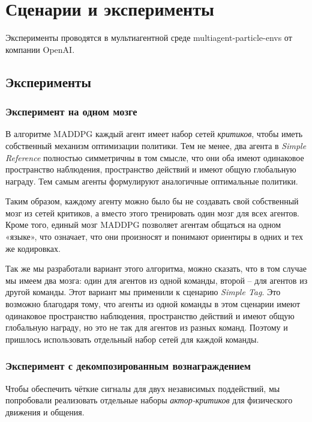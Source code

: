\chapter{Сценарии и эксперименты}

Эксперименты проводятся в мультиагентной среде multiagent-particle-envs \cite{multiagent-particle-envs} от компании OpenAI.


\section{Эксперименты}

\subsection{Эксперимент на одном мозге}

В алгоритме MADDPG каждый агент имеет набор сетей \textit{критиков}, чтобы иметь собственный механизм оптимизации политики. Тем не менее, два агента в \textit{Simple Reference} полностью симметричны в том смысле, что они оба имеют одинаковое пространство наблюдения, пространство действий и имеют общую глобальную награду. Тем самым агенты формулируют аналогичные оптимальные политики.

Таким образом, каждому агенту можно было бы не создавать свой собственный мозг из сетей критиков, а вместо этого тренировать один мозг для всех агентов. Кроме того, единый мозг MADDPG позволяет агентам общаться на одном «языке», что означает, что они произносят и понимают ориентиры в одних и тех же кодировках.

Так же мы разработали вариант этого алгоритма, можно сказать, что в том случае мы имеем два мозга: один для агентов из одной команды, второй – для агентов из другой команды. Этот вариант мы применили к сценарию \textit{Simple Tag}. Это возможно благодаря тому, что агенты из одной команды в этом сценарии имеют одинаковое пространство наблюдения, пространство действий и имеют общую глобальную награду, но это не так для агентов из разных команд. Поэтому и пришлось использовать отдельный набор сетей для каждой команды.

\subsection{Эксперимент с декомпозированным вознаграждением}

Чтобы обеспечить чёткие сигналы для двух независимых поддействий, мы попробовали реализовать отдельные наборы \textit{актор-критиков} для физического движения и общения.

